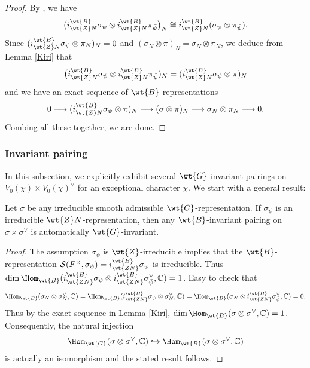 \documentclass[11pt,reqno]{amsart}
\newcommand{\BC}{{\mathbb {C}}} \newcommand{\BD}{{\mathbb {D}}}
\newcommand{\CS}{{\mathcal {S}}} \newcommand{\CT}{{\mathcal {T}}}
\newcommand{\lra}{\longrightarrow}\newcommand{\lla}{\longleftarrow}
\theoremstyle{plain}
\theoremstyle{remark} \newtheorem{remark}[thm]{Remark}
\theoremstyle{definition} \newtheorem{exercise}[thm]{Exercise}
\theoremstyle{definition} \newtheorem{example}[thm]{Example} \newtheorem{condition}[thm]{Condition}
\numberwithin{equation}{section}
\renewcommand{\-}{\text{--}}
\begin{document}
\begin{proof}By \cite[lemma 6.3]{PT11}, we have 
\[\big(i_{\wt{Z}N}^{\wt{B}}\sigma_\psi\otimes i_{\wt{Z}N}^{\wt{B}}\pi_{\bar{\psi}}\big)_N \cong i_{\wt{Z}N}^{\wt{B}}(\sigma_\psi\otimes\pi_{\bar{\psi}}).\]
 Since $(i_{\wt{Z}N}^{\wt{B}}\sigma_\psi\otimes \pi_N)_N=0$ and $(\sigma_N\otimes\pi)_N=\sigma_N\otimes\pi_N$, we deduce from  Lemma \ref{Kiri} that 
\[\big(i_{\wt{Z}N}^{\wt{B}}\sigma_\psi\otimes i_{\wt{Z}N}^{\wt{B}}\pi_{\bar{\psi}})_N=(i_{\wt{Z}N}^{\wt{B}}\sigma_\psi\otimes\pi)_N\] and we have an exact sequence of $\wt{B}$-representations
\[0\lra(i_{\wt{Z}N}^{\wt{B}}\sigma_\psi\otimes\pi)_N\lra(\sigma\otimes \pi)_N\lra \sigma_N\otimes\pi_N\lra 0. \]
Combing all these together, we are done.
\end{proof}
\subsubsection{Invariant pairing}\label{InvP}
In this subsection, we explicitly exhibit several $\wt{G}$-invariant pairings on $V_0(\chi)\times V_0(\chi)^\vee$ for an exceptional character $\chi$. We start with a general result: 
\begin{prop}\label{Inv}Let $\sigma$ be any irreducible smooth admissible $\wt{G}$-representation. If  $\sigma_\psi$ is an irreducible $\wt{Z}N$-representation, then any  $\wt{B}$-invariant pairing on $\sigma\times\sigma^\vee$ is automatically $\wt{G}$-invariant.
\end{prop}
\begin{proof}The assumption $\sigma_\psi$ is $\wt{Z}$-irreducible implies that the $\wt{B}$-representation $\CS(F^\times, \sigma_\psi)=i_{\wt{ZN}}^{\wt{B}}\sigma_\psi$ is irreducible. Thus $\dim\Hom_{\wt{B}}(i_{\wt{ZN}}^{\wt{B}}\sigma_\psi\otimes  i_{\wt{ZN}}^{\wt{B}}\sigma_{\bar{\psi}}^\vee,\BC)=1$. Easy to check that 
\[\Hom_{\wt{B}}(\sigma_N\otimes \sigma_{N}^\vee,\BC)= \Hom_{\wt{B}}(i_{\wt{ZN}}^{\wt{B}}\sigma_\psi\otimes \sigma_N^\vee,\BC)=\Hom_{\wt{B}}(\sigma_N\otimes i_{\wt{ZN}}^{\wt{B}}\sigma_{\bar{\psi}}^\vee,\BC)=0.\]
Thus by the exact sequence in Lemma \ref{Kiri},   $\dim\Hom_{\wt{B}}(\sigma\otimes\sigma^\vee,\BC)=1$. Consequently, the natural injection
\[\Hom_{\wt{G}}(\sigma\otimes\sigma^\vee,\BC)\hookrightarrow \Hom_{\wt{B}}(\sigma\otimes\sigma^\vee,\BC)\]
is actually an isomorphism and the stated result follows.
\end{proof}
\end{document}
